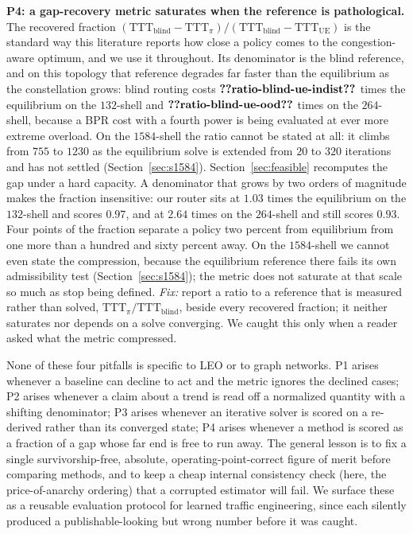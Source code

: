 \documentclass[journal]{IEEEtran}
\newcommand{\TTT}{\mathrm{TTT}}
\begin{document}
\textbf{P4: a gap-recovery metric saturates when the reference is pathological.} The recovered
fraction $(\TTT_{\mathrm{blind}}-\TTT_\pi)/(\TTT_{\mathrm{blind}}-\TTT_{\mathrm{UE}})$ is the
standard way this literature reports how close a policy comes to the congestion-aware optimum, and
we use it throughout. Its denominator is the blind reference, and on this topology that reference
degrades far faster than the equilibrium as the constellation grows: blind routing costs $\clm{ratio-blind-ue-indist}$
times the equilibrium on the $132$-shell and $\clm{ratio-blind-ue-ood}$ times on the $264$-shell, because a
BPR cost with a fourth power is being evaluated at ever more extreme overload. On the
$1584$-shell the ratio cannot be stated at all: it climbs from $755$ to $1230$ as the
equilibrium solve is extended from $20$ to $320$ iterations and has not settled
(Section~\ref{sec:s1584}). Section~\ref{sec:feasible} recomputes the gap under a hard capacity. A denominator that grows by two orders of magnitude makes the fraction insensitive: our router sits at $1.03$ times the equilibrium on the $132$-shell and scores $0.97$, and at $2.64$ times on the $264$-shell and still scores $0.93$. Four points of the fraction separate a policy two percent from equilibrium from one more than a hundred and sixty percent away. On the $1584$-shell we cannot even state the compression, because the equilibrium reference there fails its own admissibility test (Section~\ref{sec:s1584}); the metric does not saturate at that scale so much as stop being defined. \emph{Fix:} report a ratio to a reference that is measured rather than solved, $\TTT_\pi/\TTT_{\mathrm{blind}}$, beside every recovered fraction; it neither saturates nor depends on a solve converging. We caught this only when a reader asked what the metric compressed.

None of these four pitfalls is specific to LEO or to graph networks. P1 arises whenever a
baseline can decline to act and the metric ignores the declined cases; P2 arises whenever a
claim about a trend is read off a normalized quantity with a shifting denominator; P3 arises
whenever an iterative solver is scored on a re-derived rather than its converged state; P4 arises
whenever a method is scored as a fraction of a gap whose far end is free to run away. The
general lesson is to fix a single survivorship-free, absolute, operating-point-correct figure
of merit before comparing methods, and to keep a cheap internal consistency check (here, the
price-of-anarchy ordering) that a corrupted estimator will fail. We surface these as a
reusable evaluation protocol for learned traffic engineering, since each silently produced a
publishable-looking but wrong number before it was caught.
\end{document}
